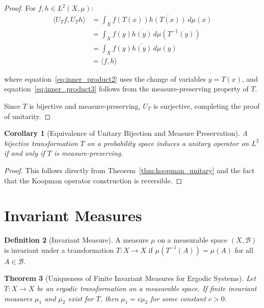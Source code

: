 \documentclass[11pt]{article}
\theoremstyle{theorem}
\newtheorem{theorem}{Theorem}[section]
\newtheorem{corollary}[theorem]{Corollary}
\theoremstyle{definition}
\newtheorem{definition}[theorem]{Definition}
\begin{document}
\begin{proof}
For $f, h \in L^2(X, \mu)$:
\begin{align}
\langle U_T f, U_T h \rangle &= \int_X f(T(x)) \overline{h(T(x))} \, d\mu(x) \label{eq:inner_product1}\\
&= \int_X f(y) \overline{h(y)} \, d\mu(T^{-1}(y)) \label{eq:inner_product2}\\
&= \int_X f(y) \overline{h(y)} \, d\mu(y) \label{eq:inner_product3}\\
&= \langle f, h \rangle \label{eq:inner_product4}
\end{align}

where equation~\eqref{eq:inner_product2} uses the change of variables $y = T(x)$, and equation~\eqref{eq:inner_product3} follows from the measure-preserving property of $T$.

Since $T$ is bijective and measure-preserving, $U_T$ is surjective, completing the proof of unitarity.
\end{proof}

\begin{corollary}[Equivalence of Unitary Bijection and Measure Preservation]
\label{cor:unitary_equiv}
A bijective transformation $T$ on a probability space induces a unitary operator on $L^2$ if and only if $T$ is measure-preserving.
\end{corollary}

\begin{proof}
This follows directly from Theorem~\ref{thm:koopman_unitary} and the fact that the Koopman operator construction is reversible.
\end{proof}

\section{Invariant Measures}

\begin{definition}[Invariant Measure]
\label{def:invariant}
A measure $\mu$ on a measurable space $(X, \mathcal{B})$ is invariant under a transformation $T: X \to X$ if $\mu(T^{-1}(A)) = \mu(A)$ for all $A \in \mathcal{B}$.
\end{definition}

\begin{theorem}[Uniqueness of Finite Invariant Measures for Ergodic Systems]
\label{thm:invariant_unique}
Let $T: X \to X$ be an ergodic transformation on a measurable space. If finite invariant measures $\mu_1$ and $\mu_2$ exist for $T$, then $\mu_1 = c\mu_2$ for some constant $c > 0$.
\end{theorem}
\end{document}
